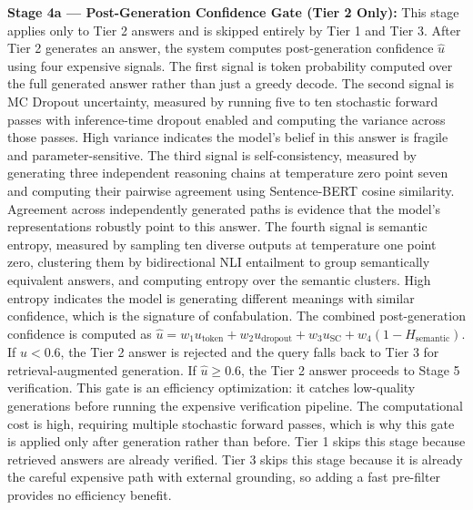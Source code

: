 \documentclass[11pt,a4paper]{article}
\newcommand{\uhat}{\hat{u}}
\begin{document}
\textbf{Stage 4a — Post-Generation Confidence Gate (Tier 2 Only):} This stage applies only to Tier 2 answers and is skipped entirely by Tier 1 and Tier 3. After Tier 2 generates an answer, the system computes post-generation confidence $\uhat$ using four expensive signals. The first signal is token probability computed over the full generated answer rather than just a greedy decode. The second signal is MC Dropout uncertainty, measured by running five to ten stochastic forward passes with inference-time dropout enabled and computing the variance across those passes. High variance indicates the model's belief in this answer is fragile and parameter-sensitive. The third signal is self-consistency, measured by generating three independent reasoning chains at temperature zero point seven and computing their pairwise agreement using Sentence-BERT cosine similarity. Agreement across independently generated paths is evidence that the model's representations robustly point to this answer. The fourth signal is semantic entropy, measured by sampling ten diverse outputs at temperature one point zero, clustering them by bidirectional NLI entailment to group semantically equivalent answers, and computing entropy over the semantic clusters. High entropy indicates the model is generating different meanings with similar confidence, which is the signature of confabulation. The combined post-generation confidence is computed as $\uhat = w_1 u_{\text{token}} + w_2 u_{\text{dropout}} + w_3 u_{\text{SC}} + w_4(1 - H_{\text{semantic}})$. If $\uhat < 0.6$, the Tier 2 answer is rejected and the query falls back to Tier 3 for retrieval-augmented generation. If $\uhat \geq 0.6$, the Tier 2 answer proceeds to Stage 5 verification. This gate is an efficiency optimization: it catches low-quality generations before running the expensive verification pipeline. The computational cost is high, requiring multiple stochastic forward passes, which is why this gate is applied only after generation rather than before. Tier 1 skips this stage because retrieved answers are already verified. Tier 3 skips this stage because it is already the careful expensive path with external grounding, so adding a fast pre-filter provides no efficiency benefit.
\end{document}
